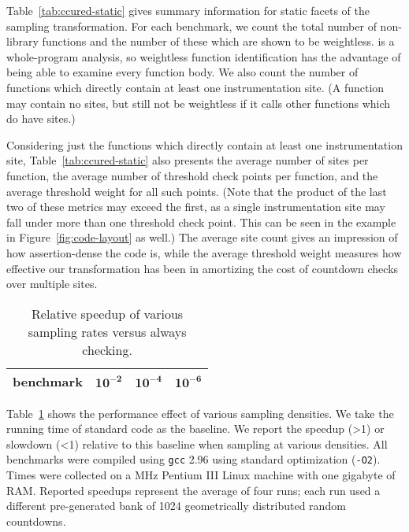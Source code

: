 Table~\ref{tab:ccured-static} gives summary information for static
facets of the sampling transformation.  For each benchmark, we count
the total number of non-library functions and the number of these
which are shown to be weightless.  \ccured is a whole-program
analysis, so weightless function identification has the advantage of
being able to examine every function body.  We also count the number
of functions which directly contain at least one instrumentation site.
(A function may contain no sites, but still not be weightless if it
calls other functions which do have sites.)

Considering just the functions which directly contain at least one
instrumentation site, Table~\ref{tab:ccured-static} also presents the
average number of sites per function, the average number of threshold
check points per function, and the average threshold weight for all
such points.  (Note that the product of the last two of these metrics
may exceed the first, as a single instrumentation site may fall under
more than one threshold check point.  This can be seen in the example
in Figure~\ref{fig:code-layout} as well.)  The average site count
gives an impression of how assertion-dense the code is, while the
average threshold weight measures how effective our transformation has
been in amortizing the cost of countdown checks over multiple sites.

\begin{table}
  \centering
  \begin{tabular}{|l|rrr|}
    \hline
    \rule{0pt}{2.5ex}
    \textbf{benchmark} & $\mathbf{10^{-2}}$ & $\mathbf{10^{-4}}$ & $\mathbf{10^{-6}}$ \\
    \hline\hline
    \hline
  \end{tabular}
  \caption{Relative speedup of various sampling rates versus always checking.}
  \label{tab:ccured-density}
\end{table}

Table~\ref{tab:ccured-density} shows the performance effect of various
sampling densities.  We take the running time of standard \ccured code
as the baseline.  We report the speedup (>1) or slowdown (<1) relative
to this baseline when sampling at various densities.  All benchmarks
were compiled using \texttt{gcc} 2.96 using standard optimization
(\texttt{-O2}).  Times were collected on a \unknown MHz Pentium III
Linux machine with one gigabyte of RAM.  Reported speedups represent
the average of four runs; each run used a different pre-generated bank
of 1024 geometrically distributed random countdowns.

